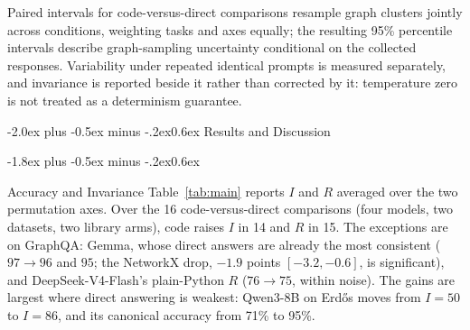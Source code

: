 \documentclass[11pt]{article}
\makeatletter
\renewcommand\section{\@startsection{section}{1}{\z@}
  {-2.0ex plus -0.5ex minus -.2ex}{0.6ex}
  {\large\bfseries\centering}}
\renewcommand\subsection{\@startsection{subsection}{2}{\z@}
  {-1.8ex plus -0.5ex minus -.2ex}{0.6ex}
  {\normalsize\bfseries\raggedright}}
\makeatother
\begin{document}
Paired intervals for code-versus-direct comparisons resample graph clusters jointly
across conditions, weighting tasks and axes equally; the resulting 95\% percentile
intervals describe graph-sampling uncertainty conditional on the collected responses.
Variability under repeated identical prompts is measured separately, and invariance
is reported beside it rather than corrected by it: temperature zero is not treated as
a determinism guarantee.

\section{Results and Discussion}
\label{sec:results}

\subsection{Accuracy and Invariance}
Table~\ref{tab:main} reports $I$ and $R$ averaged over the two permutation axes.
Over the 16 code-versus-direct comparisons (four models, two datasets, two library
arms), code raises $I$ in 14 and $R$ in 15. The exceptions are on GraphQA: Gemma,
whose direct answers are already the most consistent ($97\to96$ and $95$; the
NetworkX drop, $-1.9$ points $[-3.2,-0.6]$, is significant), and
DeepSeek-V4-Flash's plain-Python $R$ ($76\to75$, within noise). The gains are largest
where direct answering is weakest: Qwen3-8B on Erd\H{o}s moves from $I=50$ to
$I=86$, and its canonical accuracy from 71\% to 95\%.
\end{document}
